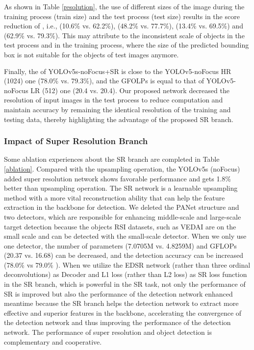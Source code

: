 As shown in Table \ref{resolution}, the use of different sizes of the image during the training process (train size) and the test process (test size) results in the score reduction of , i.e.,  (10.6\% vs. 62.2\%), (48.2\% vs. 77.7\%), (13.4\% vs. 69.5\%) and (62.9\% vs. 79.3\%). This may attribute to the inconsistent scale of objects in the test process and in the training process, where the size of the predicted bounding box is not suitable for the objects of test images anymore. 


Finally, the  of YOLOv5s-noFocus+SR is close to the YOLOv5-noFocus  HR (1024) one (78.0\% vs. 79.3\%), and the GFOLPs is equal to that of YOLOv5-noFocus LR (512)  one (20.4 vs. 20.4). Our proposed network decreased the resolution of input images in the test process to reduce computation and maintain accuracy by remaining the identical resolution of the training and testing data, thereby highlighting the advantage of the proposed SR branch.

\subsubsection{\textbf{Impact of Super Resolution Branch}}

Some ablation experiences about the SR branch are completed in Table \ref{ablation}. Compared with the upsampling operation, the YOLOv5s (noFocus) added super resolution network shows favorable performance and gets  1.8\% better than upsampling operation. The SR network is a learnable upsampling method with a more vital reconstruction ability that can help the feature extraction in the backbone for detection.  We deleted the PANet structure and two detectors, which are responsible for enhancing middle-scale and large-scale target detection because the objects RSI datasets, such as VEDAI are on the small scale and can be detected with the small-scale detector. When we only use one detector, the number of parameters (7.0705M vs. 4.8259M) and GFLOPs (20.37 vs. 16.68) can be decreased, and the detection accuracy can be increased (78.0\%  vs 79.0\% ). When we utilize the EDSR network (rather than three ordinal deconvolutions) as Decoder and L1 loss (rather than L2 loss) as SR loss function in the SR branch, which is powerful in the SR task, not only the performance of SR is improved but also the performance of the detection network enhanced meantime because the SR branch helps the detection network to extract more effective and superior features in the backbone, accelerating the convergence of the detection network and thus improving the performance of the detection network. The performance of super resolution and object detection is complementary and cooperative. 

